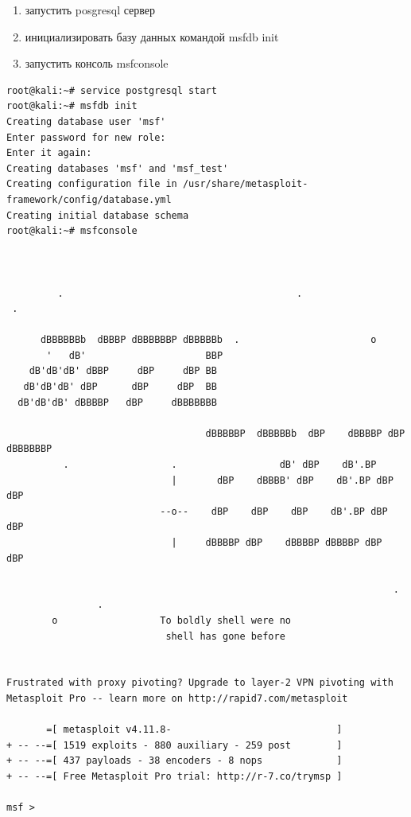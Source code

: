 \documentclass[10pt,a4paper,titlepage]{article}
\begin{document}
\begin{enumerate}
	\item запустить posgresql сервер
    \item инициализировать базу данных командой msfdb init
    \item запустить консоль msfconsole
\end{enumerate}
\begin{verbatim}
root@kali:~# service postgresql start
root@kali:~# msfdb init
Creating database user 'msf'
Enter password for new role: 
Enter it again: 
Creating databases 'msf' and 'msf_test'
Creating configuration file in /usr/share/metasploit-framework/config/database.yml
Creating initial database schema
root@kali:~# msfconsole
                                                  


         .                                         .
 .

      dBBBBBBb  dBBBP dBBBBBBP dBBBBBb  .                       o
       '   dB'                     BBP
    dB'dB'dB' dBBP     dBP     dBP BB
   dB'dB'dB' dBP      dBP     dBP  BB
  dB'dB'dB' dBBBBP   dBP     dBBBBBBB

                                   dBBBBBP  dBBBBBb  dBP    dBBBBP dBP dBBBBBBP
          .                  .                  dB' dBP    dB'.BP
                             |       dBP    dBBBB' dBP    dB'.BP dBP    dBP
                           --o--    dBP    dBP    dBP    dB'.BP dBP    dBP
                             |     dBBBBP dBP    dBBBBP dBBBBP dBP    dBP

                                                                    .
                .
        o                  To boldly shell were no
                            shell has gone before


Frustrated with proxy pivoting? Upgrade to layer-2 VPN pivoting with
Metasploit Pro -- learn more on http://rapid7.com/metasploit

       =[ metasploit v4.11.8-                             ]
+ -- --=[ 1519 exploits - 880 auxiliary - 259 post        ]
+ -- --=[ 437 payloads - 38 encoders - 8 nops             ]
+ -- --=[ Free Metasploit Pro trial: http://r-7.co/trymsp ]

msf > 
\end{verbatim}
\end{document}
